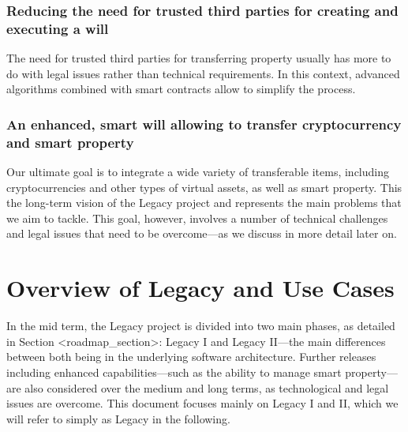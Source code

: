 \subsubsection*{Reducing the need for trusted third parties for creating and executing a will} %
\label{ssub:reducing_the_need_for_trusted_third_parties_for_creating_and_executing_a_will}
The need for trusted third parties for transferring property usually has more to do with legal issues rather than technical requirements. In this context, advanced algorithms combined with smart contracts allow to simplify the process.

\subsubsection*{An enhanced, smart will allowing to transfer cryptocurrency and smart property} %
\label{ssub:_an_enhanced_smart_will_allowing_to_transfer_cryptocurrency_and_smart_property_}
Our ultimate goal is to integrate a wide variety of transferable items, including cryptocurrencies and other types of virtual assets, as well as smart property. This the long-term vision of the Legacy project and represents the main problems that we aim to tackle. This goal, however, involves a number of technical challenges and legal issues that need to be overcome---as we discuss in more detail later on.


\section{Overview of Legacy and Use Cases} %
\label{sec:overview_of_legacy_and_use_cases}
In the mid term, the Legacy project is divided into two main phases, as detailed in Section <roadmap_section>: Legacy I and Legacy II---the main differences between both being in the underlying software architecture.  Further releases including enhanced capabilities---such as the ability to manage smart property---are also considered over the medium and long terms, as technological and legal issues are overcome. This document focuses mainly on Legacy I and II, which we will refer to simply as Legacy in the following. 

